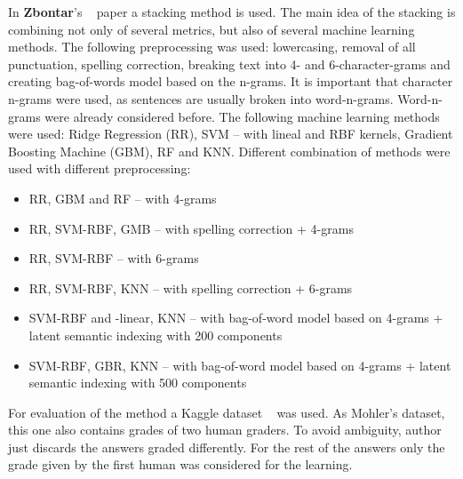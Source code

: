 In \textbf{Zbontar}'s ~\cite{Zbontar} paper a stacking method is used. The main idea of the stacking is combining not only of several metrics, but also of several machine learning methods. The following preprocessing was used: lowercasing, removal of all punctuation, spelling correction, breaking text into 4- and 6-character-grams and creating bag-of-words model based on the n-grams. It is important that character n-grams were used, as sentences are usually broken into word-n-grams. Word-n-grams were already considered before. The following machine learning methods were used: Ridge Regression (RR), SVM -- with lineal and RBF kernels, Gradient Boosting Machine (GBM), RF and KNN. Different combination of methods were used with different preprocessing:
\begin{itemize}
\item RR, GBM and RF -- with 4-grams
\item RR, SVM-RBF, GMB -- with spelling correction + 4-grams
\item RR, SVM-RBF -- with 6-grams
\item RR, SVM-RBF, KNN -- with spelling correction + 6-grams
\item SVM-RBF and -linear, KNN -- with bag-of-word model based on 4-grams + latent semantic indexing with 200 components
\item SVM-RBF, GBR, KNN -- with bag-of-word model based on 4-grams + latent semantic indexing with 500 components
\end{itemize}

For evaluation of the method a Kaggle dataset ~\cite{kaggleSas} was used. As Mohler's dataset, this one also contains grades of two human graders. To avoid ambiguity, author just discards the answers graded differently. For the rest of the answers only the grade given by the first human was considered for the learning.\\

